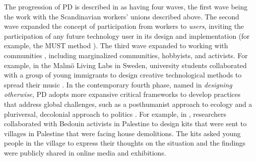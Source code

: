 \documentclass[dissertation,math,vertlayout,pdfa,colorlinks,nologo]{aaltoseries}
\begin{document}
The progression of PD is described in \cite{smithRoutledgeInternationalHandbook2025} as having four waves, the first wave being the work with the Scandinavian workers' unions described above. The second wave expanded the concept of participation from workers to \textit{users}, inviting the participation of any future technology user in its design and implementation (for example, the MUST method \cite{bodkerInvestigatingSituatedUse2014}). The third wave expanded to working with communities \cite{disalvoParticipatoryDesignCommunities2012}, including marginalized communities, hobbyists, and activists. For example, in the Malmö Living Labs in Sweden, university students collaborated with a group of young immigrants to design creative technological methods to spread their music \cite{bjorgvinssonAgonisticParticipatoryDesign2012}. In the contemporary fourth phase, named in \cite{smithRoutledgeInternationalHandbook2025} \textit{designing otherwise}, PD adopts more expansive critical frameworks to develop practices that address global challenges, such as a posthumanist approach to ecology \cite{frauenbergerEntanglementHCINext2020,heitlingerAvoidingEcocidalSmart2018} and a pluriversal, decolonial approach to politics \cite{smithPluriversalityDecolonisingDesign2024}. For example, in \cite{clarkeDecolonisingParticipatoryDesign2022}, researchers collaborated with Bedouin activists in Palestine to design kits that were sent to villages in Palestine that were facing house demolitions. The kits asked young people in the village to express their thoughts on the situation and the findings were publicly shared in online media and exhibitions.  
\end{document}
